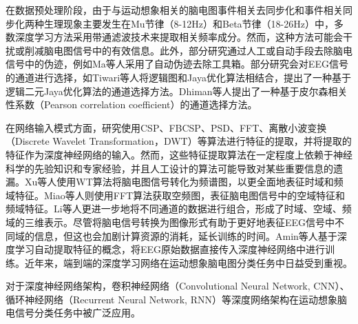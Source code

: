 在数据预处理阶段，由于与运动想象相关的脑电图事件相关去同步化和事件相关同步化两种生理现象主要发生在Mu节律（8-12Hz）和Beta节律（18-26Hz）中\cite{altaheri2023deep}，多数深度学习方法采用带通滤波技术来提取相关频率成分。然而，这种方法可能会干扰或削减脑电图信号中的有效信息。此外，部分研究通过人工或自动手段去除脑电信号中的伪迹，例如Ma等人\cite{ma2019deep}采用了自动伪迹去除工具箱\cite{gomez2006automatic}。部分研究会对EEG信号的通道进行选择，如Tiwari等人\cite{tiwari2023logistic}将逻辑图和Jaya优化算法\cite{7838661}相结合，提出了一种基于逻辑二元Jaya优化算法的通道选择方法。Dhiman等人\cite{dhiman2023electroencephalogram}提出了一种基于皮尔森相关性系数（Pearson correlation coefficient）的通道选择方法。

在网络输入模式方面，研究\cite{luo2018exploring,olivas2019classification,she2019hierarchical,ma2020dwt,chu2018decoding,hassanpour2019novel}使用CSP、FBCSP、PSD、FFT、离散小波变换（Discrete Wavelet Transformation，DWT）等算法进行特征的提取，并将提取的特征作为深度神经网络的输入。然而，这些特征提取算法在一定程度上依赖于神经科学的先验知识和专家经验，并且人工设计的算法可能导致对某些重要信息的遗漏。Xu等人\cite{xu2018wavelet}使用WT算法将脑电图信号转化为频谱图，以更全面地表征时域和频域特征。Miao等人\cite{miao2020spatial}则使用FFT算法获取空频图，表征脑电图信号中的空域特征和频域特征。Li等人\cite{li2020novel}更进一步地将不同通道的数据进行组合，形成了时域、空域、频域的三维表示。尽管将脑电信号转换为图像形式有助于更好地表征EEG信号中不同域的信息，但这也会加剧计算资源的消耗，延长训练的时间。Amin\cite{amin2019deep}等人基于深度学习自动提取特征的概念，将EEG原始数据直接传入深度神经网络中进行训练。近年来，端到端的深度学习网络在运动想象脑电图分类任务中日益受到重视。

对于深度神经网络架构，卷积神经网络（Convolutional Neural Network, CNN）、循环神经网络（Recurrent Neural Network, RNN）等深度网络架构在运动想象脑电信号分类任务中被广泛应用。

